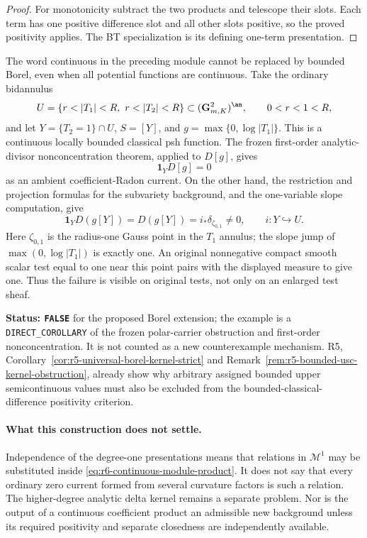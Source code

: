 \begin{proof}
For monotonicity subtract the two products and telescope their
slots. Each term has one positive difference slot and all other
slots positive, so the proved positivity applies. The BT
specialization is its defining one-term presentation.
\end{proof}

\begin{example}
\label{ex:r6-borel-curvature-module-failure}
The word continuous in the preceding module cannot be replaced by
bounded Borel, even when all potential functions are continuous.
Take the ordinary bidannulus
\[
 U=\{r<|T_1|<R,\ r<|T_2|<R\}\subset(\mathbf G_{m,K}^2)^{\an},
             \qquad 0<r<1<R,
\]
and let $Y=\{T_2=1\}\cap U$, $S=[Y]$, and
$g=\max\{0,\log|T_1|\}$. This is a continuous locally bounded
classical psh function. The frozen first-order analytic-divisor
nonconcentration theorem, applied to $D[g]$, gives
\[
                         \mathbf1_YD[g]=0
\]
as an ambient coefficient-Radon current. On the other hand, the
restriction and projection formulas for the subvariety background,
and the one-variable slope computation, give
\[
 \mathbf1_YD(g[Y])=D(g[Y])=i_*\delta_{\zeta_{0,1}}\ne0,
                  \qquad i:Y\hookrightarrow U.
\]
Here $\zeta_{0,1}$ is the radius-one Gauss point in the $T_1$ annulus;
the slope jump of $\max(0,\log|T_1|)$ is exactly one. An original
nonnegative compact smooth scalar test equal to one near this point
pairs with the displayed measure to give one. Thus the failure is
visible on original tests, not only on an enlarged test sheaf.
\end{example}

\noindent\textbf{Status: \texttt{FALSE}} for the proposed Borel
extension; the example is a \texttt{DIRECT\_COROLLARY} of the frozen
polar-carrier obstruction and first-order nonconcentration. It is not
counted as a new counterexample mechanism. R5,
Corollary~\ref{cor:r5-universal-borel-kernel-strict} and
Remark~\ref{rem:r5-bounded-usc-kernel-obstruction}, already show why
arbitrary assigned bounded upper semicontinuous values must also be
excluded from the bounded-classical-difference positivity criterion.

\paragraph{What this construction does not settle.}
Independence of the degree-one presentations means that relations in
$\mathscr M^1$ may be substituted inside
\eqref{eq:r6-continuous-module-product}. It does not say that every
ordinary zero current formed from several curvature factors is such
a relation. The higher-degree analytic delta kernel remains a separate
problem. Nor is the output of a continuous coefficient product an
admissible new background unless its required positivity and separate
closedness are independently available.
